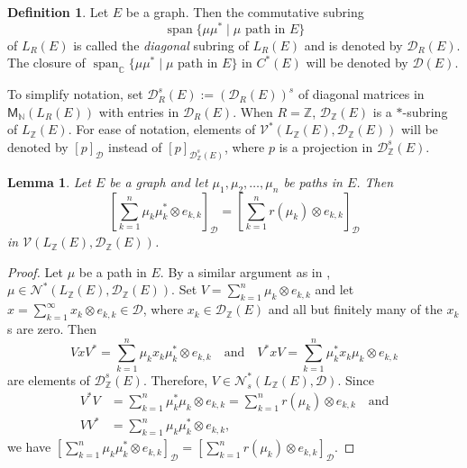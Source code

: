 \documentclass[11pt, letterpaper,final]{amsart}
\newcommand{\ZZ}{\mathbb{Z}}
\newcommand{\CC}{\mathbb{C}}
\newcommand{\NN}{\mathbb{N}}
\newcommand{\V}{\mathcal{V}}
\newcommand{\D}{\mathcal{D}}
\newcommand{\N}{\mathcal{N}}
\newcommand{\spn}{\operatorname{span}}
\newtheorem{lem}[thm]{Lemma}
\theoremstyle{definition}
\newtheorem{dfn}[thm]{Definition}
\theoremstyle{remark}
\begin{document}
\begin{dfn}
Let $E$ be a graph.  Then the commutative subring  
$$\spn \{ \mu \mu^*  \mid  \mu \text{ path in } E \}$$ 
of $L_R(E)$ is called the \emph{diagonal} subring of $L_R(E)$ and is denoted by $\D_R(E)$.  The closure of $\spn_\CC \{ \mu \mu^*  \mid  \mu \text{ path in } E \}$ in $C^*(E)$ will be denoted by $\D(E)$.
\end{dfn}
To simplify notation, set $\D_R^s(E) := (\D_R(E))^s$ of diagonal matrices in $\mathsf{M}_\NN(L_R(E))$ with entries in $\D_R(E)$.  When \(R=\ZZ\), $\D_\ZZ(E)$ is a $*$-subring of $L_\ZZ(E)$.  For ease of notation, elements of $\V^* ( L_\ZZ(E), \D_\ZZ(E))$ will be denoted by $[p]_{\D}$ instead of $[p]_{\D_\ZZ^s(E)}$, where $p$ is a projection in $\D_\ZZ^s(E)$.  


\begin{lem}\label{lem:range-source-proj}
Let $E$ be a graph and let $\mu_1, \mu_2, \ldots, \mu_n$ be paths in $E$.  Then 
$$\left[ \sum_{ k = 1}^n \mu_k \mu_k^* \otimes e_{k,k} \right]_{ \D } = \left[ \sum_{ k = 1}^n r(\mu_k) \otimes e_{k,k} \right]_{ \D}$$
in $\V(L_\ZZ(E), \D_\ZZ(E))$.
\end{lem}

\begin{proof}
Let $\mu$ be a path in $E$.  By a similar argument as in \cite[Lemma~4.1]{BCW2017}, $\mu \in \N^*( L_\ZZ(E), \D_\ZZ(E))$.  Set $V = \sum_{ k = 1}^n \mu_k \otimes e_{k,k}$ and let $x = \sum_{k = 1}^\infty x_k \otimes e_{k,k} \in \D$, where $x_k \in \D_\ZZ(E)$ and all but finitely many of the $x_k$s are zero.  Then
\[V x V^* = \sum_{k=1}^n \mu_k x_k \mu_k^* \otimes e_{k,k}   \quad \text{and} \quad V^* x V = \sum_{k=1}^n \mu_k^* x_k \mu_k \otimes e_{k,k}\]
are elements of $\D^s_\ZZ(E)$.  Therefore, $V \in \N_s^*( L_\ZZ(E), \D)$.  Since
\begin{align*}
V^*V &= \sum_{ k = 1}^n \mu_k^* \mu_k \otimes e_{k,k} = \sum_{ k = 1}^n r(\mu_k) \otimes e_{k,k} \quad \text{and} \\
VV^* &= \sum_{ k = 1}^n \mu_k \mu_k^* \otimes e_{k,k},
\end{align*}
we have $\left[ \sum_{ k = 1}^n \mu_k \mu_k^* \otimes e_{k,k} \right]_{ \D} = \left[ \sum_{ k = 1}^n r(\mu_k)\otimes e_{k,k} \right]_{ \D}$.
\end{proof}
\end{document}
